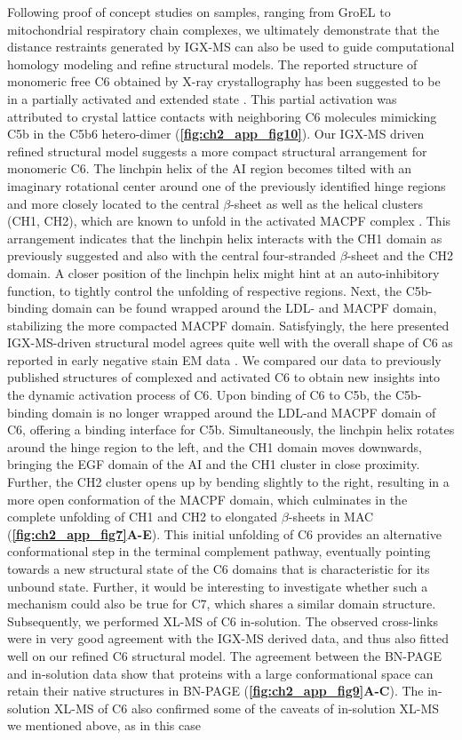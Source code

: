 Following proof of concept studies on samples, ranging from GroEL to mitochondrial respiratory chain complexes, we ultimately demonstrate that the distance restraints generated by IGX-MS can also be used to guide computational homology modeling and refine structural models. The reported structure of monomeric free C6 obtained by X-ray crystallography has been suggested to be in a partially activated and extended state \cite{Aleshin_2012}. This partial activation was attributed to crystal lattice contacts with neighboring C6 molecules mimicking C5b in the C5b6 hetero-dimer (\textbf{\autoref{fig:ch2_app_fig10}}). Our IGX-MS driven refined structural model suggests a more compact structural arrangement for monomeric C6. The linchpin helix of the AI region becomes tilted with an imaginary rotational center around one of the previously identified hinge regions \cite{Aleshin_2012} and more closely located to the central $\beta$-sheet as well as the helical clusters (CH1, CH2), which are known to unfold in the activated MACPF complex \cite{Menny_2018}. This arrangement indicates that the linchpin helix interacts with the CH1 domain as previously suggested \cite{Aleshin_2012} and also with the central four-stranded $\beta$-sheet and the CH2 domain. A closer position of the linchpin helix might hint at an auto-inhibitory function, to tightly control the unfolding of respective regions. Next, the C5b-binding domain can be found wrapped around the LDL- and MACPF domain, stabilizing the more compacted MACPF domain. Satisfyingly, the here presented IGX-MS-driven structural model agrees quite well with the overall shape of C6 as reported in early negative stain EM data \cite{DiScipio_1989}. We compared our data to previously published structures of complexed and activated C6 to obtain new insights into the dynamic activation process of C6. Upon binding of C6 to C5b, the C5b-binding domain is no longer wrapped around the LDL-and MACPF domain of C6, offering a binding interface for C5b. Simultaneously, the linchpin helix rotates around the hinge region to the left, and the CH1 domain moves downwards, bringing the EGF domain of the AI and the CH1 cluster in close proximity. Further, the CH2 cluster opens up by bending slightly to the right, resulting in a more open conformation of the MACPF domain, which culminates in the complete unfolding of CH1 and CH2 to elongated $\beta$-sheets in MAC (\textbf{\autoref{fig:ch2_app_fig7}A-E}). This initial unfolding of C6 provides an alternative conformational step in the terminal complement pathway, eventually pointing towards a new structural state of the C6 domains that is characteristic for its unbound state. Further, it would be interesting to investigate whether such a mechanism could also be true for C7, which shares a similar domain structure. Subsequently, we performed XL-MS of C6 in-solution. The observed cross-links were in very good agreement with the IGX-MS derived data, and thus also fitted well on our refined C6 structural model. The agreement between the BN-PAGE and in-solution data show that proteins with a large conformational space can retain their native structures in BN-PAGE (\textbf{\autoref{fig:ch2_app_fig9}A-C}). The in-solution XL-MS of C6 also confirmed some of the caveats of in-solution XL-MS we mentioned above, as in this case 